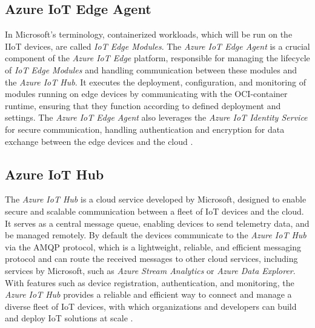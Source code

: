 \subsection{Azure IoT Edge Agent}
In Microsoft's terminology, containerized workloads, which will be run on the \ac{IIoT}
devices, are called \textit{IoT Edge Modules}.
The \textit{Azure IoT Edge Agent} is a crucial component of the \textit{Azure IoT Edge}
platform, responsible for managing the lifecycle of \textit{IoT Edge Modules} and
handling communication between these modules and the \textit{Azure IoT Hub}.
It executes the deployment, configuration, and monitoring of modules running on
edge devices by communicating with the \ac{OCI}-container runtime,
ensuring that they function according to defined deployment and settings.
The \textit{Azure IoT Edge Agent} also leverages the \textit{Azure IoT Identity Service}
for secure communication, handling authentication and encryption for data exchange
between the edge devices and the cloud \cite{msdoc-aziotedge-arch}.


\subsection{Azure IoT Hub}
The \textit{Azure IoT Hub} is a cloud service developed by Microsoft, designed to
enable secure and scalable communication between a fleet of \ac{IoT} devices and
the cloud. It serves as a central message queue, enabling devices to send telemetry
data, and be managed remotely. By default the devices communicate to the
\textit{Azure IoT Hub}
via the \ac{AMQP} protocol, which is a lightweight, reliable, and efficient
messaging protocol and can route the received messages to other cloud services,
including services by Microsoft, such as \textit{Azure Stream Analytics} or
\textit{Azure Data Explorer}.
With features such as device registration,
authentication, and monitoring, the \textit{Azure IoT Hub} provides a reliable and efficient
way to connect and manage a diverse fleet of \ac{IoT} devices, with which
organizations and developers can build and deploy \ac{IoT} solutions at scale \cite{msdoc-aziothub}.

